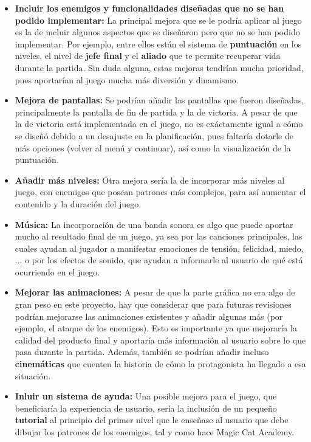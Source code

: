 \begin{itemize}
\item \textbf{Incluir los enemigos y funcionalidades diseñadas que no se han podido implementar:} La principal mejora que se le podría aplicar al juego es la de incluir algunos aspectos que se diseñaron pero que no se han podido implementar. Por ejemplo, entre ellos están el sistema de \textbf{puntuación} en los niveles, el nivel de \textbf{jefe final} y el \textbf{aliado} que te permite recuperar vida durante la partida. Sin duda alguna, estas mejoras tendrían mucha prioridad, pues aportarían al juego mucha más diversión y dinamismo.

 \item \textbf{Mejora de pantallas:} Se podrían añadir las pantallas que fueron diseñadas, principalmente la pantalla de fin de partida y la de victoria. A pesar de que la de victoria está implementada en el juego, no es exáctamente igual a cómo se diseñó debido a un desajuste en la planificación, pues faltaría dotarle de más opciones (volver al menú y continuar), así como la visualización de la puntuación.

 \item \textbf{Añadir más niveles:} Otra mejora sería la de incorporar más niveles al juego, con enemigos que posean patrones más complejos, para así aumentar el contenido y la duración del juego.
 
  \item \textbf{Música:} La incorporación de una banda sonora es algo que puede aportar mucho al resultado final de un juego, ya sea por las canciones principales, las cuales ayudan al jugador a manifestar emociones de tensión, felicidad, miedo, ... o por los efectos de sonido, que ayudan a informarle al usuario de qué está ocurriendo en el juego.
 
 \item \textbf{Mejorar las animaciones:} A pesar de que la parte gráfica no era algo de gran peso en este proyecto, hay que considerar que para futuras revisiones podrían mejorarse las animaciones existentes y añadir algunas más (por ejemplo, el ataque de los enemigos). Esto es importante ya que mejoraría la calidad del producto final y aportaría más información al usuario sobre lo que pasa durante la partida. Además, también se podrían añadir incluso \textbf{cinemáticas} que cuenten la historia de cómo la protagonista ha llegado a esa situación.
 
 \item \textbf{Inluir un sistema de ayuda:} Una posible mejora para el juego, que beneficiaría la experiencia de usuario, sería la inclusión de un pequeño \textbf{tutorial} al principio del primer nivel que le enseñase al usuario que debe dibujar los patrones de los enemigos, tal y como hace Magic Cat Academy.
 

\end{itemize}
